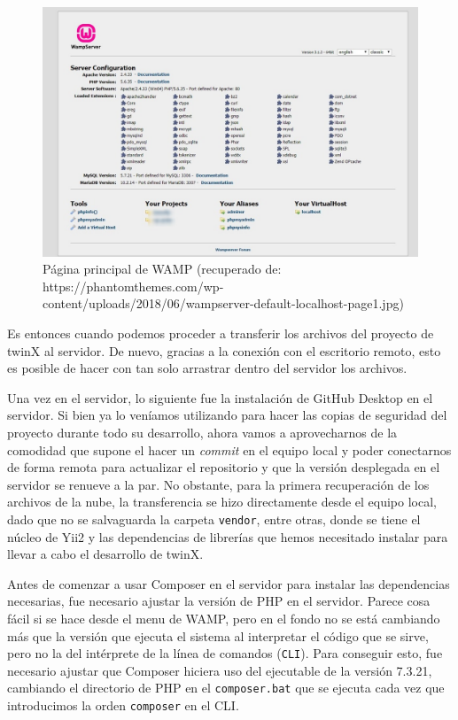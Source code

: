 \begin{figure}
	\centering
	\includegraphics[width=\linewidth]{img/wampinit}
	\caption[Página principal de WAMP]{Página principal de WAMP (recuperado de: https://phantomthemes.com/wp-content/uploads/2018/06/wampserver-default-localhost-page1.jpg)}
	\label{fig:wampinit}
\end{figure}

Es entonces cuando podemos proceder a transferir los archivos del proyecto de twinX al servidor. De nuevo, gracias a la conexión con el escritorio remoto, esto es posible de hacer con tan solo arrastrar dentro del servidor los archivos. 

Una vez en el servidor, lo siguiente fue la instalación de GitHub Desktop \cite{githubdesktop} en el servidor. Si bien ya lo veníamos utilizando para hacer las copias de seguridad del proyecto durante todo su desarrollo, ahora vamos a aprovecharnos de la comodidad que supone el hacer un \textit{commit} en el equipo local y poder conectarnos de forma remota para actualizar el repositorio y que la versión desplegada en el servidor se renueve a la par. No obstante, para la primera recuperación de los archivos de la nube, la transferencia se hizo directamente desde el equipo local, dado que no se salvaguarda la carpeta \texttt{vendor}, entre otras, donde se tiene el núcleo de Yii2 y las dependencias de librerías que hemos necesitado instalar para llevar a cabo el desarrollo de twinX.

Antes de comenzar a usar Composer en el servidor para instalar las dependencias necesarias, fue necesario ajustar la versión de PHP en el servidor. Parece cosa fácil si se hace desde el menu de WAMP, pero en el fondo no se está cambiando más que la versión que ejecuta el sistema al interpretar el código que se sirve, pero no la del intérprete de la línea de comandos (\texttt{CLI}). Para conseguir esto, fue necesario ajustar que Composer hiciera uso del ejecutable de la versión 7.3.21, cambiando el directorio de PHP en el \texttt{composer.bat} que se ejecuta cada vez que introducimos la orden \texttt{composer} en el CLI.

